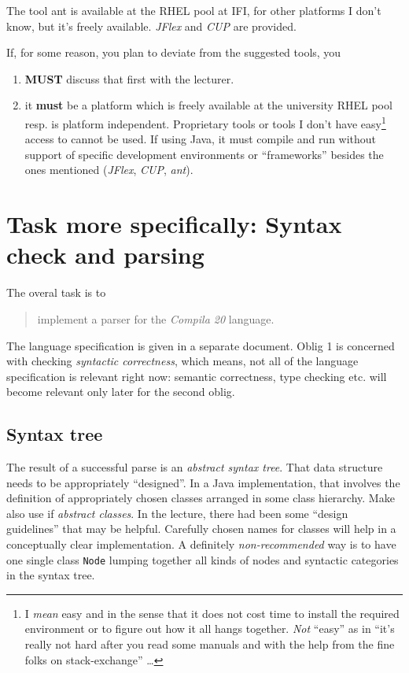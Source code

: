\documentclass[10pt,freeform]{handout}[2014/08/13]
\begin{document}
The tool ant is available at the RHEL pool at IFI, for other platforms I
don't know, but it's freely available. \textsl{JFlex} and \textsl{CUP} are
provided.

If, for some reason, you plan to deviate from the suggested tools, you
\begin{enumerate}
\item \textbf{MUST} discuss that first with the lecturer.
\item it \textbf{must} be a platform which is freely available at the
  university RHEL pool resp. is  platform independent. Proprietary tools or
  tools I don't have easy\footnote{I \emph{mean} easy and in the sense that
    it does not cost time to install the required environment or to figure
    out how it all hangs together. \emph{Not} ``easy'' as in ``it's really
    not hard after you read some manuals and with the help from the fine
    folks on stack-exchange'' \ldots} access to cannot be used. If using Java, it
  must compile and run without support of specific development environments
  or ``frameworks'' besides the ones mentioned (\textsl{JFlex},
  \textsl{CUP}, \textsl{ant}).
\end{enumerate}



\section{Task more specifically: Syntax check and parsing}
\label{sec:task-more-spec}


The overal task is to 

\begin{quote}
  implement a parser for the \textsl{Compila 20} language.
\end{quote}
The language specification is given in a separate document. Oblig 1 is
concerned with checking \emph{syntactic correctness}, which means, not all
of the language specification is relevant right now: semantic correctness,
type checking etc. will become relevant only later for the second oblig.


\subsection{Syntax tree}
\label{sec:syntax-tree}

The result of a successful parse is an \emph{abstract syntax tree}. That
data structure needs to be appropriately ``designed''. In a Java
implementation, that involves the definition of appropriately chosen
classes arranged in some class hierarchy. Make also use if \emph{abstract
  classes}. In the lecture, there had been some ``design guidelines'' that
may be helpful. Carefully chosen names for classes will help in a
conceptually clear implementation. A definitely \emph{non-recommended} way
is to have one single class \texttt{Node} lumping together all kinds of
nodes and syntactic categories in the syntax tree.
\end{document}
